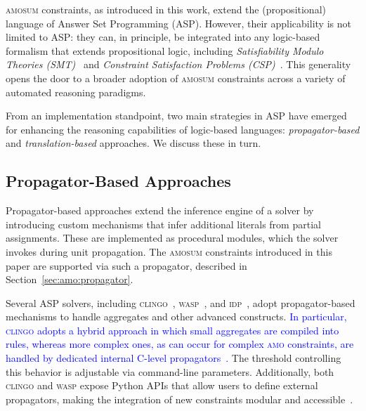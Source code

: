 \documentclass[preprint,authoryear]{elsarticle}
\theoremstyle{definition}
\begin{document}
\textsc{amosum} constraints, as introduced in this work, extend the (propositional) language of Answer Set Programming (ASP). However, their applicability is not limited to ASP:
they can, in principle, be integrated into any logic-based formalism that extends propositional logic, including \emph{Satisfiability Modulo Theories (SMT)}~\citep{DBLP:journals/jacm/NieuwenhuisOT06} and \emph{Constraint Satisfaction Problems (CSP)}~\citep{DBLP:journals/eor/BrailsfordPS99,Rossi2006Handbook}.
This generality opens the door to a broader adoption of \textsc{amosum} constraints across a variety of automated reasoning paradigms.

From an implementation standpoint, two main strategies in ASP have emerged for enhancing the reasoning capabilities of logic-based languages: 
\emph{propagator-based} and \emph{translation-based} approaches. 
We discuss these in turn.


\subsection{Propagator-Based Approaches}

Propagator-based approaches extend the inference engine of a solver by introducing custom mechanisms that infer additional literals from partial assignments.
These are implemented as procedural modules, which the solver invokes during unit propagation. 
The \textsc{amosum} constraints introduced in this paper are supported via such a propagator, described in Section~\ref{sec:amo:propagator}.

Several ASP solvers, including \textsc{clingo}~\citep{DBLP:journals/ai/GebserKS12,DBLP:journals/tplp/GebserKKS19}, \linebreak \textsc{wasp}~\citep{DBLP:journals/tplp/AlvianoDM18}, and \textsc{idp}~\citep{Denecker2010DPLLAggAE,DBLP:journals/ngc/0001JCJBD16}, adopt propagator-based mechanisms to handle aggregates and other advanced constructs.
\textcolor{blue}{In particular, \textsc{clingo} adopts a hybrid approach in which small aggregates are compiled into rules, whereas more complex ones, as can occur for complex \textsc{amo} constraints, are handled by dedicated internal C-level propagators~\citep{DBLP:conf/iclp/GebserKKS09}.}
The threshold controlling this behavior is adjustable via command-line parameters.
Additionally, both \textsc{clingo} and \textsc{wasp} expose Python APIs that allow users to define external propagators, making the integration of new constraints modular and accessible~\citep{DBLP:journals/algorithms/CabalarFSW23,DBLP:journals/tplp/DodaroR20}.
\end{document}
